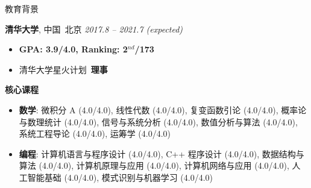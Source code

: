 \documentclass{resume} %
\begin{document}

\begin{rSection}{教育背景}

{\textbf{清华大学}, 中国\ 北京} \hfill {\em 2017.8 -- 2021.7 (expected)}
\begin{itemize}
    信息学院\ 自动化系\ \textbf{工程学士学位} (expected)
    \item \textbf{GPA: 3.9/4.0, Ranking: 2$^{nd}$/173}
    \item 清华大学星火计划\ \textbf{理事}
\end{itemize}

\textbf{核心课程}
\begin{itemize}
    \item \textbf{数学}: 微积分 A (4.0/4.0), 
    线性代数 (4.0/4.0), 
    复变函数引论 (4.0/4.0), 
    概率论与数理统计 (4.0/4.0), 
    信号与系统分析 (4.0/4.0), 
    数值分析与算法 (4.0/4.0), 
    系统工程导论 (4.0/4.0), 
    运筹学 (4.0/4.0)
    \item \textbf{编程}: 计算机语言与程序设计 (4.0/4.0), 
    C++ 程序设计 (4.0/4.0), 
    数据结构与算法 (4.0/4.0), 
    计算机原理与应用 (4.0/4.0), 
    计算机网络与应用 (4.0/4.0), 
    人工智能基础 (4.0/4.0), 
    模式识别与机器学习 (4.0/4.0)\newline
\end{itemize}

\end{rSection}
\end{document}
